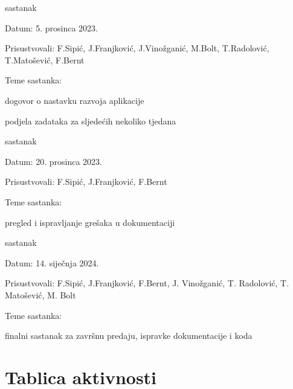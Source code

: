 \begin{packed_enum}
			\item  sastanak
			\item[] \begin{packed_item}
				\item Datum: 5. prosinca 2023.
				\item Prisustvovali: F.Sipić, J.Franjković, J.Vinožganić, M.Bolt, T.Radolović, T.Matošević, F.Bernt
				\item Teme sastanka:
				\begin{packed_item}
					\item  dogovor o nastavku razvoja aplikacije
					\item podjela zadataka za sljedećih nekoliko tjedana
				\end{packed_item}
			\end{packed_item}

			\item  sastanak
			\item[] \begin{packed_item}
				\item Datum: 20. prosinca 2023.
				\item Prisustvovali: F.Sipić, J.Franjković, F.Bernt
				\item Teme sastanka:
				\begin{packed_item}
					\item  pregled i ispravljanje grešaka u dokumentaciji
				\end{packed_item}
			\end{packed_item}
			
			\item  sastanak
			\item[] \begin{packed_item}
				\item Datum: 14. siječnja 2024.
				\item Prisustvovali: F.Sipić, J.Franjković, F.Bernt, J. Vinožganić, T. Radolović, T. Matošević, M. Bolt
				\item Teme sastanka:
				\begin{packed_item}
					\item  finalni sastanak za završnu predaju, ispravke dokumentacije i koda
				\end{packed_item}
			\end{packed_item}
			
			
		\end{packed_enum}
		
		\eject
		\section*{Tablica aktivnosti}

